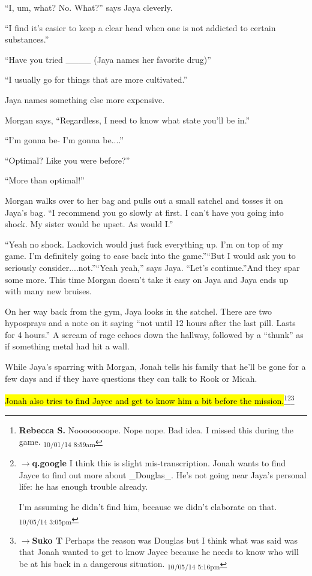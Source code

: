 ``I, um, what? No.  What?'' says Jaya cleverly.

``I find it's easier to keep a clear head when one is not addicted to certain substances.''

``Have you tried \_\_\_\_ (Jaya names her favorite drug)''

``I usually go for things that are more cultivated.''

Jaya names something else more expensive.

Morgan says, ``Regardless, I need to know what state you'll be in.''

``I'm gonna be- I'm gonna be....''

``Optimal?  Like you were before?''

``More than optimal!''

Morgan walks over to her bag and pulls out a small satchel and tosses it on Jaya's bag.  ``I recommend you go slowly at first.  I can't have you going into shock.  My sister would be upset.  As would I.''

``Yeah no shock.  Lackovich would just fuck everything up.  I'm on top of my game.  I'm definitely going to ease back into the game.''``But I would ask you to seriously consider....not.''``Yeah yeah,'' says Jaya.  ``Let's continue.''And they spar some more.  This time Morgan doesn't take it easy on Jaya and Jaya ends up with many new bruises.



On her way back from the gym, Jaya looks in the satchel. There are two hyposprays and a note on it saying ``not until 12 hours after the last pill.  Lasts for 4 hours.''   A scream of rage echoes down the hallway, followed by a ``thunk'' as if something metal had hit a wall.



While Jaya's sparring with Morgan, Jonah tells his family that he'll be gone for a few days and if they have questions they can talk to Rook or Micah.



\hl{Jonah also tries to find Jayce and get to know him a bit before the mission.}\footnote{\textbf{Rebecca S. }Noooooooope. Nope nope. Bad idea.  I missed this during the game. \textsubscript{10/01/14 8:59am}}\footnote{$\rightarrow$\textbf{q.google }I think this is slight mis-transcription.  Jonah wants to find Jayce to find out more about \_Douglas\_.  He's not going near Jaya's personal life: he has enough trouble already.

I'm assuming he didn't find him, because we didn't elaborate on that. \textsubscript{10/05/14 3:05pm}}\footnote{$\rightarrow$\textbf{Suko T }Perhaps the reason was Douglas but I think what was said was that Jonah wanted to get to know Jayce because he needs to know who will be at his back in a dangerous situation. \textsubscript{10/05/14 5:16pm}}




